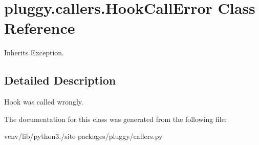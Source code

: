 \hypertarget{classpluggy_1_1callers_1_1_hook_call_error}{}\section{pluggy.\+callers.\+Hook\+Call\+Error Class Reference}
\label{classpluggy_1_1callers_1_1_hook_call_error}


Inherits Exception.



\subsection{Detailed Description}
\begin{DoxyVerb}Hook was called wrongly. \end{DoxyVerb}
 

The documentation for this class was generated from the following file\+:\begin{DoxyCompactItemize}
\item 
venv/lib/python3./site-\/packages/pluggy/callers.\+py\end{DoxyCompactItemize}
